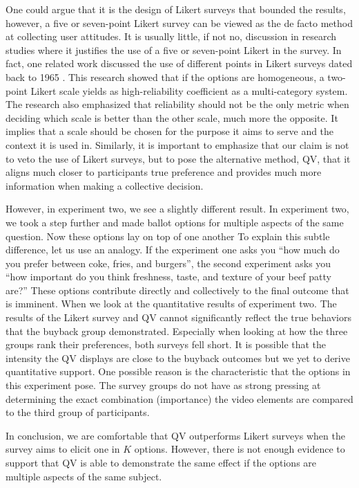 One could argue that it is the design of Likert surveys that bounded the results, however,
a five or seven-point Likert survey can be viewed as the de facto method at collecting user attitudes.
It is usually little, if not no, discussion in research studies where it justifies the use of a five or seven-point Likert in the survey.
In fact, one related work discussed the use of different points in Likert surveys dated back to 1965 \cite{komorita1965number}. 
This research showed that if the options are homogeneous, a two-point Likert scale yields as high-reliability coefficient as a multi-category system.
The research also emphasized that reliability should not be the only metric when deciding which scale is better than the other scale, much more the opposite.
It implies that a scale should be chosen for the purpose it aims to serve and the context it is used in.
Similarly, it is important to emphasize that our claim is not to veto the use of Likert surveys, but to pose the alternative method, QV, that it aligns much closer to participants true preference and provides much more information when making a collective decision.\par

However, in experiment two,
we see a slightly different result.
In experiment two,
we took a step further 
and made ballot options for multiple aspects
of the same question.
Now these options lay on top of one another
To explain this subtle difference,
let us use an analogy.
If the experiment one asks you
``how much do you prefer between
coke, fries, and burgers'',
the second experiment asks you
``how important do you think
freshness, taste, and texture 
of your beef patty are?''
These options contribute
directly and collectively
to the final outcome
that is imminent.
When we look at the quantitative results of experiment two.
The results of the Likert survey and QV 
cannot significantly reflect the true behaviors that the buyback group demonstrated.
Especially when looking at how the three groups
rank their preferences,
both surveys fell short.
It is possible that
the intensity the QV displays
are close to the buyback outcomes
but we yet to derive quantitative support.
One possible reason is the characteristic 
that the options in this experiment pose.
The survey groups do not have as strong pressing
at determining the exact combination (importance)
the video elements are
compared to the third group of participants.

In conclusion,
we are comfortable that QV outperforms Likert surveys
when the survey aims to elicit one in $K$ options.
However, there is not enough evidence to support that
QV is able to demonstrate the same effect
if the options are multiple aspects of the same subject.

